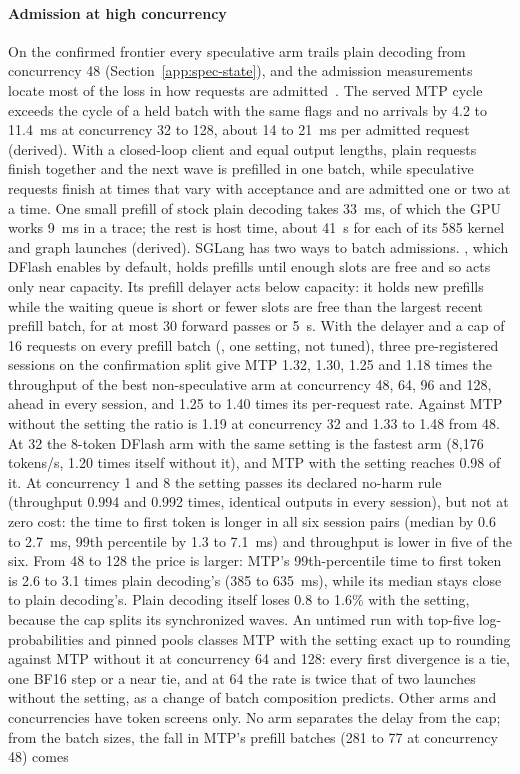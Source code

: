 \paragraph{Admission at high concurrency}\label{sec:stack-admission} On the confirmed frontier every speculative arm trails plain decoding from concurrency 48 (Section~\ref{app:spec-state}), and the admission measurements locate most of the loss in how requests are admitted~. The served MTP cycle exceeds the cycle of a held batch with the same flags and no arrivals by 4.2 to 11.4~ms at concurrency 32 to 128, about 14 to 21~ms per admitted request (derived). With a closed-loop client and equal output lengths, plain requests finish together and the next wave is prefilled in one batch, while speculative requests finish at times that vary with acceptance and are admitted one or two at a time. One small prefill of stock plain decoding takes 33~ms, of which the GPU works 9~ms in a trace; the rest is host time, about 41~\textmu s for each of its 585 kernel and graph launches (derived). SGLang has two ways to batch admissions. , which DFlash enables by default, holds prefills until enough slots are free and so acts only near capacity. Its prefill delayer acts below capacity: it holds new prefills while the waiting queue is short or fewer slots are free than the largest recent prefill batch, for at most 30 forward passes or 5~s. With the delayer and a cap of 16 requests on every prefill batch (, one setting, not tuned), three pre-registered sessions on the confirmation split give MTP 1.32, 1.30, 1.25 and 1.18 times the throughput of the best non-speculative arm at concurrency 48, 64, 96 and 128, ahead in every session, and 1.25 to 1.40 times its per-request rate. Against MTP without the setting the ratio is 1.19 at concurrency 32 and 1.33 to 1.48 from 48. At 32 the 8-token DFlash arm with the same setting is the fastest arm (8,176 tokens/s, 1.20 times itself without it), and MTP with the setting reaches 0.98 of it. At concurrency 1 and 8 the setting passes its declared no-harm rule (throughput 0.994 and 0.992 times, identical outputs in every session), but not at zero cost: the time to first token is longer in all six session pairs (median by 0.6 to 2.7~ms, 99th percentile by 1.3 to 7.1~ms) and throughput is lower in five of the six. From 48 to 128 the price is larger: MTP's 99th-percentile time to first token is 2.6 to 3.1 times plain decoding's (385 to 635~ms), while its median stays close to plain decoding's. Plain decoding itself loses 0.8 to 1.6\% with the setting, because the cap splits its synchronized waves. An untimed run with top-five log-probabilities and pinned pools classes MTP with the setting exact up to rounding against MTP without it at concurrency 64 and 128: every first divergence is a tie, one BF16 step or a near tie, and at 64 the rate is twice that of two launches without the setting, as a change of batch composition predicts. Other arms and concurrencies have token screens only. No arm separates the delay from the cap; from the batch sizes, the fall in MTP's prefill batches (281 to 77 at concurrency 48) comes 